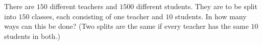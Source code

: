 There are $150$ different teachers and $1500$ different students. They are to be split into $150$ classes, each consisting of one teacher and $10$ students. In how many ways can this be done? (Two splits are the same if every teacher has the same $10$ students in both.)
